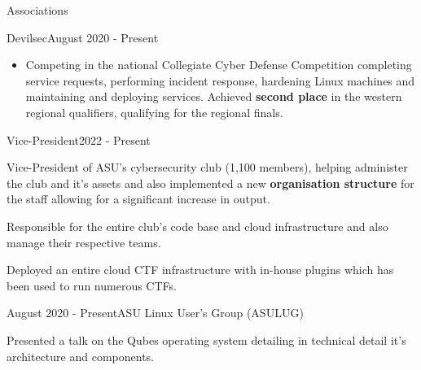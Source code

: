 \documentclass{article}
\newlength{\tabin}
\newlength{\secsep}
\newcommand{\lineunder}{\vspace*{-8pt} \\ \hspace*{-6pt} \hrulefill \\ \vspace*{-15pt}}
\newenvironment{tabbedsection}[1]{
  \begin{list}{}{
      \setlength{\itemsep}{0pt}
      \setlength{\labelsep}{0pt}
      \setlength{\labelwidth}{0pt}
      \setlength{\leftmargin}{0pt}
      \setlength{\rightmargin}{\tabin}
      \setlength{\listparindent}{0pt}
      \setlength{\parsep}{0pt}
      \setlength{\parskip}{0pt}
      \setlength{\partopsep}{0pt}
      \setlength{\topsep}{#1}
    }
  \item[]
}{\end{list}}
\newenvironment{resume_section}[1]{
  \filbreak
  \vspace{2\secsep}
  \textsc{\color{blue}\large#1}
  \lineunder
  \begin{tabbedsection}{\secsep}
}{\end{tabbedsection}}
\newenvironment{resume_subsection}[2]{
  \textbf{\color{BlueViolet}#2} \hfill {\normalsize (#1)} \hspace{-5em}
  \begin{tabbedsection}{0.5\secsep}
  \begin{subitems}
}{\end{subitems}\end{tabbedsection}}
\newenvironment{subitems}{
  \renewcommand{\labelitemi}{-}
  \begin{itemize}
      \setlength{\labelsep}{1em}
}{\end{itemize}}
\newenvironment{resume_employer}[3]{
  \vspace{\secsep}
  \textbf{\color{BlueViolet}#1} \hfill {\normalsize (#3)} \hspace{-5em}
  \begin{tabbedsection}{0pt}
    \ifthenelse{\isempty{#2}}%
        {}%
        {\textbf{#2}}%
}{\end{tabbedsection}}
\newenvironment{resume_position}[2]{
    \vspace{\secsep}
    \textbf{#1} \hfill {\normalsize (#2)} \hspace{-2.64em}
    \begin{subitems}
}{\end{subitems}}
\begin{document}
\begin{resume_section}{Associations}
    \begin{resume_employer}{Devilsec}{}{August 2020 - Present}
        \begin{subitems}
        \item Competing in the national Collegiate Cyber Defense Competition completing service requests, performing incident response, hardening Linux machines and maintaining and deploying services. Achieved \textbf{second place} in the western regional qualifiers, qualifying for the regional finals.
        \end{subitems}

        \begin{resume_position}{Vice-President}{2022 - Present}
            \item Vice-President of ASU's cybersecurity club (1,100 members), helping administer the club and it's assets and also implemented a new \textbf{organisation structure} for the staff allowing for a significant increase in output.
            \item Responsible for the entire club's code base and cloud infrastructure and also manage their respective teams.
            \item Deployed an entire cloud CTF infrastructure with in-house plugins which has been used to run numerous CTFs.
        \end{resume_position}
    \end{resume_employer}
    \vspace{2\secsep}
    \begin{resume_subsection}{August 2020 - Present}{ASU Linux User's Group (ASULUG)}
        \item Presented a talk on the Qubes operating system detailing in technical detail it's architecture and components. \href{https://tayari.gg/talks/qubes-technical-introduction/}{\faExternalLinkSquare*}
    \end{resume_subsection}
\end{resume_section}
\end{document}
